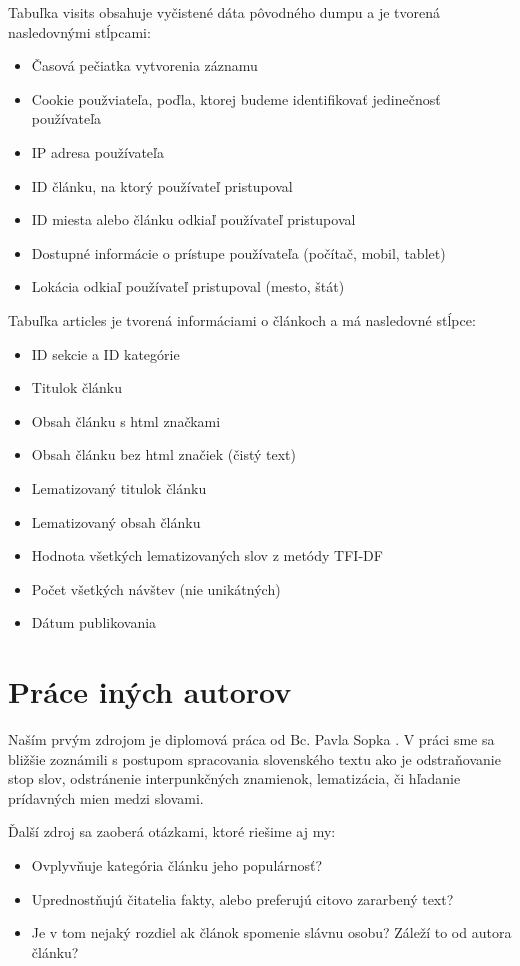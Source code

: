 \documentclass[runningheads,a4paper]{llncs}
\begin{document}
Tabuľka visits obsahuje vyčistené dáta pôvodného dumpu a je tvorená nasledovnými stĺpcami:
\begin{itemize}
\renewcommand{\labelitemi}{$\bullet$}
  \item Časová pečiatka vytvorenia záznamu
  \item Cookie použviateľa, poďla, ktorej budeme identifikovať jedinečnosť používateľa
  \item IP adresa používateľa
  \item ID článku, na ktorý používateľ pristupoval
  \item ID miesta alebo článku odkiaľ používateľ pristupoval
  \item Dostupné informácie o prístupe používateľa (počítač, mobil, tablet)
  \item Lokácia odkiaľ používateľ pristupoval (mesto, štát)
\end{itemize}

Tabuľka articles je tvorená informáciami o článkoch a má nasledovné stĺpce:
\begin{itemize}
\renewcommand{\labelitemi}{$\bullet$}
  \item ID sekcie a ID kategórie
  \item Titulok článku
  \item Obsah článku s html značkami
  \item Obsah článku bez html značiek (čistý text) 
  \item Lematizovaný titulok článku
  \item Lematizovaný obsah článku
  \item Hodnota všetkých lematizovaných slov z metódy TFI-DF 
  \item Počet všetkých návštev (nie unikátných)  
  \item Dátum publikovania
\end{itemize}

\section{Práce iných autorov}
Naším prvým zdrojom je diplomová práca od Bc. Pavla Sopka \cite{diplomovka}. 
V práci sme sa bližšie zoznámili s postupom spracovania slovenského textu ako je odstraňovanie stop slov, odstránenie interpunkčných znamienok, lematizácia, či hľadanie prídavných mien medzi slovami.

Ďalší zdroj sa zaoberá otázkami, ktoré riešime aj my:
\begin{itemize}
\renewcommand{\labelitemi}{$\bullet$}
  \item Ovplyvňuje kategória článku jeho populárnosť?
  \item Uprednostňujú čitatelia fakty, alebo preferujú citovo zararbený text?
  \item Je v tom nejaký rozdiel ak článok spomenie slávnu osobu? Záleží to od autora článku?
\end{itemize}
\end{document}
